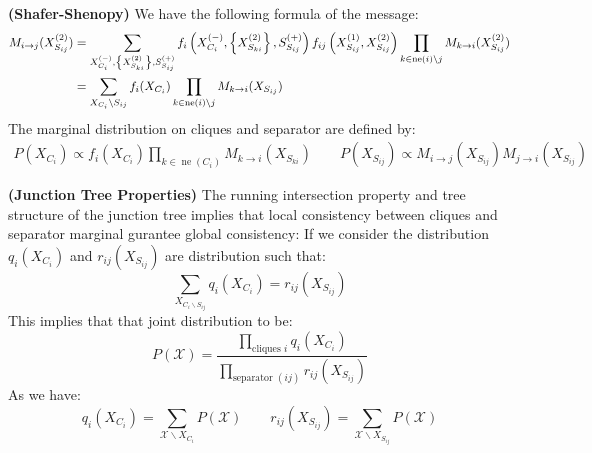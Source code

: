 \begin{definition}{\textbf{(Shafer-Shenopy)}}
    We have the following formula of the message:
    \begin{equation*}
    \begin{aligned}
        M_{i\rightarrow j}(X^{(2)}_{S_{ij}}) &= \sum_{ X^{(-)}_{C_i}, \left\{ X^{(2)}_{S_{ki}}  \right\}, S^{(+)}_{S_{ij}} } f_i\left( X^{(-)}_{C_i}, \left\{ X^{(2)}_{S_{ki}}  \right\}, S^{(+)}_{S_{ij}}  \right) f_{ij}\left( X^{(1)}_{S_{ij}}, X^{(2)}_{S_{ij}} \right) \prod_{k\in\operatorname{ne}(i)\backslash j} M_{k\rightarrow i}(X^{(2)}_{S_{ij}}) \\
        &= \sum_{X_{C_i}\backslash S_{ij}}f_i(X_{C_i}) \prod_{k\in\operatorname{ne}(i)\backslash j} M_{k\rightarrow i}(X_{S_{ij}}) \\
    \end{aligned}
    \end{equation*}
    The marginal distribution on cliques and separator are defined by:
    \begin{equation*}
    \begin{aligned}
        P(X_{C_i}) \propto f_i(X_{C_i})\prod_{k\in\operatorname{ne}(C_i)}M_{k\rightarrow i}(X_{S_{ki}}) \qquad P(X_{S_{ij}}) \propto M_{i\rightarrow j}(X_{S_{ij}})M_{j\rightarrow i}(X_{S_{ij}})
    \end{aligned}
    \end{equation*}
\end{definition}

\begin{remark}{\textbf{(Junction Tree Properties)}}
    The running intersection property and tree structure of the junction tree implies that local consistency between cliques and separator marginal gurantee global consistency: If we consider the distribution $q_i(X_{C_i})$ and $r_{ij}(X_{S_{ij}})$ are distribution such that:
    \begin{equation*}
        \sum_{X_{C_i\backslash S_{ij}}} q_i(X_{C_i}) = r_{ij}(X_{S_{ij}})
    \end{equation*}
    This implies that that joint distribution to be:
    \begin{equation*}
        P(\mathcal{X}) = \frac{\prod_{\text{cliques } i} q_i(X_{C_i})}{\prod_{\text{separator } (ij)} r_{ij}(X_{S_{ij}})}
    \end{equation*}
    As we have:
    \begin{equation*}
        q_i(X_{C_i}) = \sum_{\mathcal{X}\backslash X_{C_i}}P(\mathcal{X}) \qquad r_{ij}(X_{S_{ij}}) =  \sum_{\mathcal{X}\backslash X_{S_{ij}}}P(\mathcal{X})
    \end{equation*}
\end{remark}

